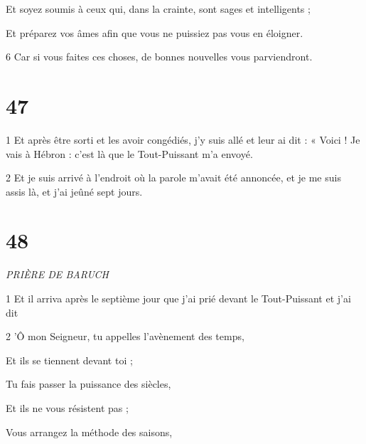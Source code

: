 \par Et soyez soumis à ceux qui, dans la crainte, sont sages et intelligents ;

\par Et préparez vos âmes afin que vous ne puissiez pas vous en éloigner.

\par 6 Car si vous faites ces choses, de bonnes nouvelles vous parviendront.

\par [Dont je vous ai déjà parlé ; et vous ne tomberez pas dans le tourment dont je vous ai déjà témoigné.

\par 7 Mais quant à la parole selon laquelle je devais être emmené, je ne l'ai pas fait savoir à eux ni à mon fils.]

\chapter{47}

\par 1 Et après être sorti et les avoir congédiés, j'y suis allé et leur ai dit : « Voici ! Je vais à Hébron : c'est là que le Tout-Puissant m'a envoyé.

\par 2 Et je suis arrivé à l'endroit où la parole m'avait été annoncée, et je me suis assis là, et j'ai jeûné sept jours.

\chapter{48}

\par \textit{PRIÈRE DE BARUCH}

\par 1 Et il arriva après le septième jour que j'ai prié devant le Tout-Puissant et j'ai dit

\par 2 'Ô mon Seigneur, tu appelles l'avènement des temps,

\par Et ils se tiennent devant toi ;

\par Tu fais passer la puissance des siècles,

\par Et ils ne vous résistent pas ;

\par Vous arrangez la méthode des saisons,

